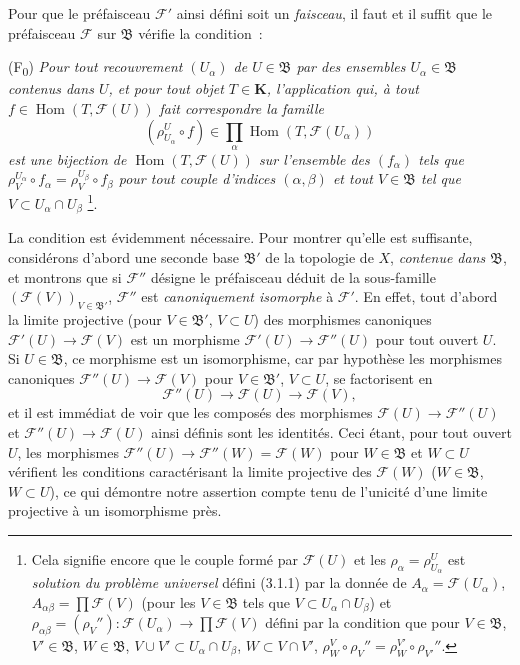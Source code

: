 \begin{env}[3.2.2]
\label{0.3.2.2-fr}
Pour que le préfaisceau $\mathcal{F}'$ ainsi défini soit un \emph{faisceau},
il faut et il suffit que le préfaisceau $\mathcal{F}$ sur $\mathfrak{B}$
vérifie la condition~:

\smallskip
\noindent
\textup{(F\textsubscript{0})} \emph{Pour tout recouvrement $(U_\alpha)$ de
$U\in\mathfrak{B}$ par des ensembles $U_\alpha\in\mathfrak{B}$ contenus dans
$U$, et pour tout objet $T\in\boldsymbol{K}$, l'application qui, à tout
$f\in\operatorname{Hom}(T,\mathcal{F}(U))$ fait correspondre la famille
\[
  (\rho_{U_\alpha}^{U}\circ f)
  \in\prod_\alpha\operatorname{Hom}(T,\mathcal{F}(U_\alpha))
\]
est une bijection de $\operatorname{Hom}(T,\mathcal{F}(U))$ sur l'ensemble des
$(f_\alpha)$ tels que
$\rho_V^{U_\alpha}\circ f_\alpha=\rho_V^{U_\beta}\circ f_\beta$ pour tout
couple d'indices $(\alpha,\beta)$ et tout $V\in\mathfrak{B}$ tel que
$V\subset U_\alpha\cap U_\beta$}%
\footnote{Cela signifie encore que le couple formé par $\mathcal{F}(U)$ et les
$\rho_\alpha=\rho_{U_\alpha}^{U}$ est \emph{solution du problème universel}
défini (3.1.1) par la donnée de
$A_\alpha=\mathcal{F}(U_\alpha)$,
$A_{\alpha\beta}=\prod\mathcal{F}(V)$ (pour les $V\in\mathfrak{B}$ tels que
$V\subset U_\alpha\cap U_\beta$) et
$\rho_{\alpha\beta}=(\rho_V''):\mathcal{F}(U_\alpha)\to
\prod\mathcal{F}(V)$ défini par la condition que pour
$V\in\mathfrak{B}$, $V'\in\mathfrak{B}$, $W\in\mathfrak{B}$,
$V\cup V'\subset U_\alpha\cap U_\beta$, $W\subset V\cap V'$,
$\rho_W^V\circ\rho_V''=\rho_W^{V'}\circ\rho_{V'}''$.}.

La condition est évidemment nécessaire. Pour montrer qu'elle est suffisante,
considérons d'abord une seconde base $\mathfrak{B}'$ de la topologie de $X$,
\emph{contenue dans $\mathfrak{B}$}, et montrons que si $\mathcal{F}''$
désigne le préfaisceau déduit de la sous-famille
$(\mathcal{F}(V))_{V\in\mathfrak{B}'}$, $\mathcal{F}''$ est
\emph{canoniquement isomorphe} à $\mathcal{F}'$. En effet, tout d'abord la
limite projective (pour $V\in\mathfrak{B}'$, $V\subset U$) des morphismes
canoniques $\mathcal{F}'(U)\to\mathcal{F}(V)$ est un morphisme
$\mathcal{F}'(U)\to\mathcal{F}''(U)$ pour tout ouvert $U$. Si
$U\in\mathfrak{B}$, ce morphisme est un isomorphisme, car par hypothèse les
morphismes canoniques $\mathcal{F}''(U)\to\mathcal{F}(V)$ pour
$V\in\mathfrak{B}'$, $V\subset U$, se factorisent en
\[
  \mathcal{F}''(U)\to\mathcal{F}(U)\to\mathcal{F}(V),
\]
et il est immédiat de voir que les composés des morphismes
$\mathcal{F}(U)\to\mathcal{F}''(U)$ et
$\mathcal{F}''(U)\to\mathcal{F}(U)$ ainsi définis sont les identités. Ceci
étant, pour tout ouvert $U$, les morphismes
$\mathcal{F}''(U)\to\mathcal{F}''(W)=\mathcal{F}(W)$ pour
$W\in\mathfrak{B}$ et $W\subset U$ vérifient les conditions caractérisant la
limite projective des $\mathcal{F}(W)$ ($W\in\mathfrak{B}$, $W\subset U$), ce
qui démontre notre assertion compte tenu de l'unicité d'une limite projective
à un isomorphisme près.


\end{env}
